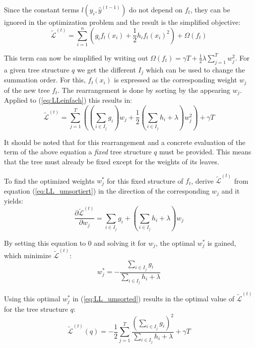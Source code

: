 \documentclass[a4paper,12pt]{scrartcl}
\newcommand{\LL}{\ensuremath{\mathcal{L}}}
\begin{document}
Since the constant terms $l(y_i,\hat{y}^{(t-1)})$ do not depend on $f_t$, they can be ignored in the optimization problem and the result is the simplified objective:
\begin{equation} \label{eq:LLeinfach}
\tilde{\LL}^{(t)} = \sum_{i=1}^{n}( g_if_t(x_i) + \frac{1}{2} h_i f_t(x_i)^2) + \Omega(f_t)
\end{equation}

This term can now be simplified by writing out $\Omega(f_t) = \gamma T + \frac{1}{2}\lambda \sum_{j=1}^{T} w_j^2$. For a given tree structure $q$ we get the different $I_j$ which can be used to change the summation order. For this, $f_t(x_i)$ is expressed as the corresponding weight $w_j$ of the new tree $f_t$. The rearrangement is done by sorting by the appearing $w_j$. Applied to (\ref{eq:LLeinfach}) this results in:
\begin{equation} \label{eq:LL_umsortiert}
\tilde{\LL}^{(t)} = \sum_{j=1}^T\left( (\sum_{i \in I_j} g_i) w_j + \frac{1}{2} (\sum_{i \in I_j} h_i + \lambda)w_j^2 \right) + \gamma T
\end{equation}

It should be noted that for this rearrangement and a concrete evaluation of the term of the above equation a \textit{fixed} tree structure $q$ must be provided. This means that the tree must already be fixed except for the weights of its leaves.

To find the optimized weights $w^*_j$ for this fixed structure of $f_t$, derive $\tilde{\LL}^{(t)}$ from equation (\ref{eq:LL_umsortiert}) in the direction of the corresponding $w_j$ and it yields:
\begin{equation} \label{eq:LL_ableitung}
\frac{\partial \tilde{\LL}^{(t)}}{\partial w_j} = \sum_{i \in I_j} g_i + (\sum_{i \in I_j} h_i + \lambda)w_j
\end{equation}

By setting this equation to $0$ and solving it for $w_j$, the optimal $w^*_j$ is gained, which minimize $\tilde{\LL}^{(t)}$:
\begin{equation}
w_j^* = - \frac{\sum_{i \in I_j} g_i}{\sum_{i \in I_j} h_i + \lambda}
\end{equation}

Using this optimal $w_j^*$ in (\ref{eq:LL_umsorted}) results in the optimal value of $\tilde{\LL}^{(t)}$ for the tree structure $q$:
\begin{equation}
\tilde{\LL}^{(t)} (q) = - \frac{1}{2} \sum_{j=1}^{T} \frac{(\sum_{i \in I_j} g_i)^2}{\sum_{i \in I_j} h_i + \lambda} + \gamma T
\end{equation}
\end{document}
